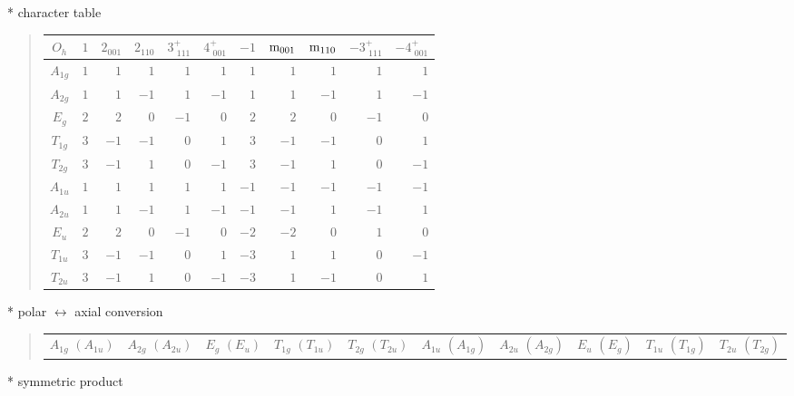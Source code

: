 \documentclass[fleqn,10pt,landscape]{jsarticle}
\begin{document}
* character table
\begin{quote}
\begin{tabular}{crrrrrrrrrr} \hline \hline
$ O_{h} $ & $ 1 $ & $ 2{}_{001} $ & $ 2{}_{110} $ & $ 3^{+}_{\,\,111} $ & $ 4^{+}_{\,\,001} $ & $ -1 $ & $ {\rm m}_{001} $ & $ {\rm m}_{110} $ & $ -3^{+}_{\,\,111} $ & $ -4^{+}_{\,\,001} $ \\ \hline
$ A_{1g} $ & $ 1 $ & $ 1 $ & $ 1 $ & $ 1 $ & $ 1 $ & $ 1 $ & $ 1 $ & $ 1 $ & $ 1 $ & $ 1 $ \\
$ A_{2g} $ & $ 1 $ & $ 1 $ & $ -1 $ & $ 1 $ & $ -1 $ & $ 1 $ & $ 1 $ & $ -1 $ & $ 1 $ & $ -1 $ \\
$ E_{g} $ & $ 2 $ & $ 2 $ & $ 0 $ & $ -1 $ & $ 0 $ & $ 2 $ & $ 2 $ & $ 0 $ & $ -1 $ & $ 0 $ \\
$ T_{1g} $ & $ 3 $ & $ -1 $ & $ -1 $ & $ 0 $ & $ 1 $ & $ 3 $ & $ -1 $ & $ -1 $ & $ 0 $ & $ 1 $ \\
$ T_{2g} $ & $ 3 $ & $ -1 $ & $ 1 $ & $ 0 $ & $ -1 $ & $ 3 $ & $ -1 $ & $ 1 $ & $ 0 $ & $ -1 $ \\
$ A_{1u} $ & $ 1 $ & $ 1 $ & $ 1 $ & $ 1 $ & $ 1 $ & $ -1 $ & $ -1 $ & $ -1 $ & $ -1 $ & $ -1 $ \\
$ A_{2u} $ & $ 1 $ & $ 1 $ & $ -1 $ & $ 1 $ & $ -1 $ & $ -1 $ & $ -1 $ & $ 1 $ & $ -1 $ & $ 1 $ \\
$ E_{u} $ & $ 2 $ & $ 2 $ & $ 0 $ & $ -1 $ & $ 0 $ & $ -2 $ & $ -2 $ & $ 0 $ & $ 1 $ & $ 0 $ \\
$ T_{1u} $ & $ 3 $ & $ -1 $ & $ -1 $ & $ 0 $ & $ 1 $ & $ -3 $ & $ 1 $ & $ 1 $ & $ 0 $ & $ -1 $ \\
$ T_{2u} $ & $ 3 $ & $ -1 $ & $ 1 $ & $ 0 $ & $ -1 $ & $ -3 $ & $ 1 $ & $ -1 $ & $ 0 $ & $ 1 $ \\
 \hline \hline
\end{tabular}
\end{quote}
* polar $\leftrightarrow$ axial conversion
\begin{quote}
\begin{tabular}{cccccccccc}
$ A_{1g}\,\,(A_{1u}) $ & $ A_{2g}\,\,(A_{2u}) $ & $ E_{g}\,\,(E_{u}) $ & $ T_{1g}\,\,(T_{1u}) $ & $ T_{2g}\,\,(T_{2u}) $ & $ A_{1u}\,\,(A_{1g}) $ & $ A_{2u}\,\,(A_{2g}) $ & $ E_{u}\,\,(E_{g}) $ & $ T_{1u}\,\,(T_{1g}) $ & $ T_{2u}\,\,(T_{2g}) $
\end{tabular}
\end{quote}
* symmetric product
\end{document}
